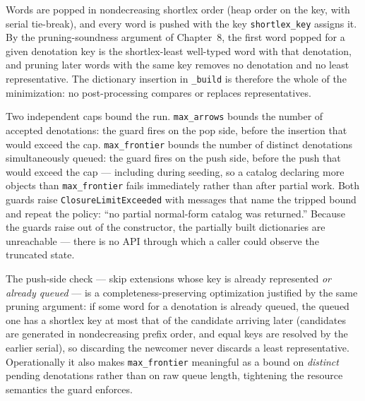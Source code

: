 \begin{invariant}\label{ch09:inv:first-least}
Words are popped in nondecreasing shortlex order (heap order on the key,
with serial tie-break), and every word is pushed with the key
\texttt{shortlex\_key} assigns it. By the pruning-soundness argument of
Chapter~8, the first word popped for a given denotation key is the
shortlex-least well-typed word with that denotation, and pruning later
words with the same key removes no denotation and no least
representative. The dictionary insertion in \texttt{\_build} is therefore
the whole of the minimization: no post-processing compares or replaces
representatives.
\end{invariant}

\begin{construction}\label{ch09:con:guards}
Two independent caps bound the run. \texttt{max\_arrows} bounds the number
of accepted denotations: the guard fires on the pop side, before the
insertion that would exceed the cap. \texttt{max\_frontier} bounds the
number of distinct denotations simultaneously queued: the guard fires on
the push side, before the push that would exceed the cap --- including
during seeding, so a catalog declaring more objects than
\texttt{max\_frontier} fails immediately rather than after partial work.
Both guards raise \texttt{ClosureLimitExceeded} with messages that name
the tripped bound and repeat the policy: ``no partial normal-form catalog
was returned.'' Because the guards raise out of the constructor, the
partially built dictionaries are unreachable --- there is no API through
which a caller could observe the truncated state.
\end{construction}

\begin{remark}\label{ch09:rem:dedupe}
The push-side check --- skip extensions whose key is already represented
\emph{or already queued} --- is a completeness-preserving optimization
justified by the same pruning argument: if some word for a denotation is
already queued, the queued one has a shortlex key at most that of the
candidate arriving later (candidates are generated in nondecreasing prefix
order, and equal keys are resolved by the earlier serial), so discarding
the newcomer never discards a least representative. Operationally it also
makes \texttt{max\_frontier} meaningful as a bound on \emph{distinct}
pending denotations rather than on raw queue length, tightening the
resource semantics the guard enforces.
\end{remark}

